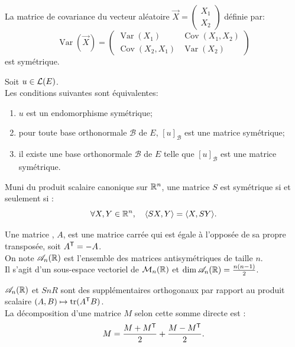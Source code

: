 \documentclass{book}
\begin{document}
\begin{Exemple}La matrice de covariance du vecteur aléatoire $\vec {X}=\begin{pmatrix}X_{1}\\X_{2}\end{pmatrix}$ définie par:
$$\operatorname {Var} ({\vec {X}})={\begin{pmatrix}\operatorname {Var} (X_{1})&\operatorname {Cov} (X_{1},X_{2})\\\operatorname {Cov} (X_{2},X_{1}) &  \operatorname {Var} (X_{2}) \end{pmatrix}}$$ est symétrique.
\end{Exemple}
\begin{Proposition}
Soit $u\in \mathcal{L}(E)$.\\
Les conditions suivantes sont équivalentes:
\begin{enumerate}[label=\roman*.]
\item $u$ est un endomorphisme symétrique;
\item pour toute base orthonormale $\mathcal{B}$ de $E$,
  $[u]_\mathcal{B}$ est une matrice symétrique;
\item il existe une base orthonormale $\mathcal{B}$ de $E$
  telle que $[u]_\mathcal{B}$ est une matrice symétrique.
\end{enumerate}
\end{Proposition}
\begin{Proposition} Muni du produit scalaire canonique sur $\mathbb{R}^n$,  une matrice $S$ est symétrique si et seulement si :
$$\forall X,Y\in  \mathbb{R}^n, \quad  \langle SX,Y\rangle=\langle X,SY\rangle.$$
\end{Proposition}
\begin{Definition}
Une matrice , $A$, est une matrice carrée qui est égale à l'opposée de sa propre transposée, soit $A^{\mathsf {T}}=-A$.\\
On note $\mathscr{A}_n(\mathbb{R})$ est l'ensemble des matrices antisymétriques de taille $n$.\\
Il s'agit d'un sous-espace vectoriel de $\mathcal{M}_{n}(\mathbb{R})$ et $\dim \mathscr{A}_n(\mathbb{R})=  \frac{n(n-1)}{2}$.
\end{Definition}
\begin{Proposition}
$\mathscr{A}_n(\mathbb{R})$ et $SnR$ sont des supplémentaires orthogonaux par rapport au produit scalaire  $(A,B)\mapsto \operatorname{tr}(A^{\mathsf {T}}B)$.\\
La décomposition d'une matrice $M$ selon cette somme directe est : 
$$M= \frac{M+M^{\mathsf {T}}}{2}+ \frac{M-M^{\mathsf {T}}}{2}.$$
\end{Proposition}
\end{document}
